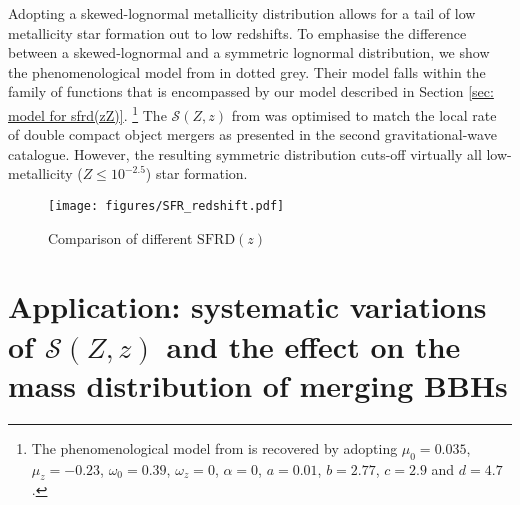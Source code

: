 \documentclass[twocolumn]{aastex631}
\newcommand{\SFRDzZ}{\ensuremath{\mathcal{S}(Z,z)}\xspace}
\newcommand{\SFRDz}{\ensuremath{\mathrm{SFRD}(z)}\xspace}
\begin{document}
Adopting a skewed-lognormal metallicity distribution allows for a tail of low metallicity star formation out to low redshifts. To emphasise the difference between a skewed-lognormal and a symmetric lognormal distribution, we show the phenomenological model from \cite{Neijssel+2019} in dotted grey. Their model falls within the family of functions that is encompassed by our model described in Section \ref{sec: model for sfrd(zZ)}. \footnote{The phenomenological model from \cite{Neijssel+2019} is recovered by adopting $\mu_0= 0.035$, $\mu_z=-0.23$, $\omega_0=0.39 $, $\omega_z = 0$, $\alpha = 0$, $a=0.01$, $b=2.77$, $c=2.9$ and $d=4.7$. }
The \SFRDzZ from \cite{Neijssel+2019} was optimised to match the local rate of double compact object mergers as presented in the second gravitational-wave catalogue. However, the resulting symmetric distribution cuts-off virtually all low-metallicity ($Z\leq 10^{-2.5}$) star formation.


\begin{figure}
\centering
{}
\texttt{[image: figures/SFR\_redshift.pdf]}
\caption{Comparison of different \SFRDz
 \label{fig: SFR(z)}}
\end{figure}



\section{Application: systematic variations of \SFRDzZ and the effect on the mass distribution of merging BBHs \label{sec: mass dists}}
\end{document}
